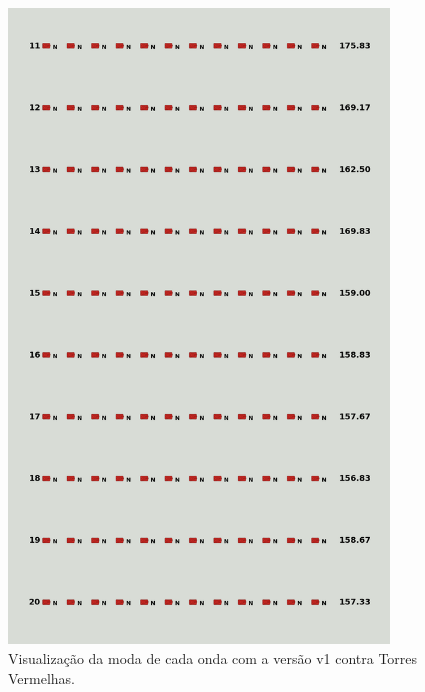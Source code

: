 \begin{figure}[H]
  \centering
  \includegraphics[width=0.9\textwidth]{figuras/td/td_allred_ai_mode_1_2.png}
  \caption{Visualização da moda de cada onda com a versão v1 contra Torres Vermelhas.}
  \label{fig:td-moda-red-1-2}
\end{figure}

